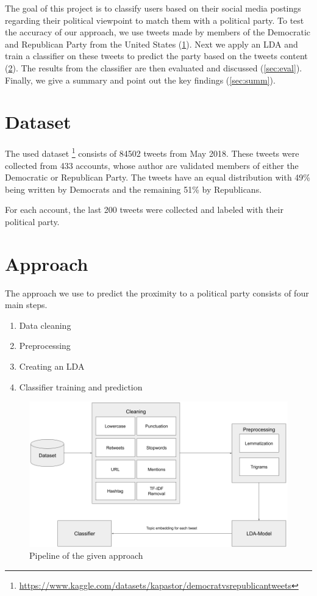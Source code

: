 \documentclass[sigconf, nonacm]{acmart}
\begin{document}
The goal of this project is to classify users based on their social media postings regarding their political viewpoint to match them with a political party. 
To test the accuracy of our approach, we use tweets made by members of the Democratic and Republican Party from the United States (\ref{sec:data}).
Next we apply an LDA and train a classifier on these tweets to predict the party based on the tweets content (\ref{sec:app}). The results from the classifier are then evaluated and discussed (\ref{sec:eval}). Finally, we give a summary and point out the key findings (\ref{sec:summ}).

\section{Dataset}
\label{sec:data}
The used dataset \footnote{\url{https://www.kaggle.com/datasets/kapastor/democratvsrepublicantweets}} consists of 84502 tweets from May 2018. 
These tweets were collected from 433 accounts, whose author are validated members of either the Democratic or Republican Party. 
The tweets have an equal distribution with 49\% being written by Democrats and the remaining 51\% by Republicans.

For each account, the last 200 tweets were collected and labeled with their political party.

\section{Approach}
\label{sec:app}
The approach we use to predict the proximity to a political party consists of four main steps.

\begin{enumerate}
	\item Data cleaning
	\item Preprocessing
	\item Creating an LDA
	\item Classifier training and prediction
\end{enumerate}

\begin{figure}[h]
	\centering
	\includegraphics[width=0.9\linewidth]{figures/pipeline}
	\caption{Pipeline of the given approach}
	\label{fig:pipeline}
\end{figure}
\end{document}
